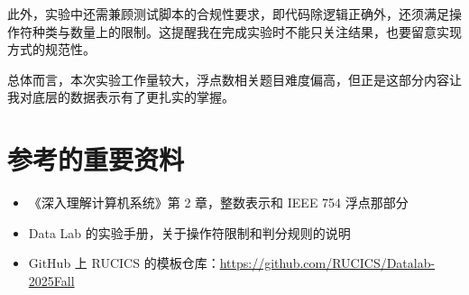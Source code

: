 \documentclass[11pt, a4paper]{ctexart}
\begin{document}
此外，实验中还需兼顾测试脚本的合规性要求，即代码除逻辑正确外，还须满足操作符种类与数量上的限制。这提醒我在完成实验时不能只关注结果，也要留意实现方式的规范性。

总体而言，本次实验工作量较大，浮点数相关题目难度偏高，但正是这部分内容让我对底层的数据表示有了更扎实的掌握。

\section{参考的重要资料}

\begin{itemize}[itemsep=0.3em]
    \item 《深入理解计算机系统》第 2 章，整数表示和 IEEE 754 浮点那部分
    \item Data Lab 的实验手册，关于操作符限制和判分规则的说明
    \item GitHub 上 RUCICS 的模板仓库：\url{https://github.com/RUCICS/Datalab-2025Fall}
\end{itemize}
\end{document}
